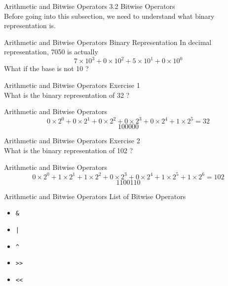 \documentclass{beamer}
\begin{document}
    \begin{frame}{Arithmetic and Bitwise Operators}
        \color{blue} \Large 3.2 Bitwise Operators \\
        
        \color{black} \normalsize \vskip 10pt 
        Before going into this subsection, we need to understand what binary 
        representation is.
    
    \end{frame}
    
    \begin{frame}{Arithmetic and Bitwise Operators}
        \color{blue} \Large Binary Representation
        \color{black} \normalsize \vskip 10pt
        In decimal representation, 7050 is actually
        \[ 7 \times 10^3 + 0 \times 10^2 + 5 \times 10^1 + 0 \times 10^0 \]
        \vskip 30pt
        What if the base is not 10 ?
    \end{frame}
    
    \begin{frame}{Arithmetic and Bitwise Operators}
        \color{blue} \Large Exercise 1 \\
        \color{black} \normalsize \vskip 10pt
        What is the binary representation of 32 ?
    \end{frame}

    \begin{frame}{Arithmetic and Bitwise Operators}
        $$ 0 \times 2^0 + 0 \times 2^1 + 0 \times 2^2 + 0 \times 2^3
        + 0 \times 2^4 + 1 \times 2^5 = 32 $$
        $$ 100000 $$
    \end{frame}
    
    \begin{frame}{Arithmetic and Bitwise Operators}
        \color{blue} \Large Exercise 2 \\
        \color{black} \normalsize \vskip 10pt
        What is the binary representation of 102 ?
    \end{frame}

    \begin{frame}{Arithmetic and Bitwise Operators}
        $$ 0 \times 2^0 + 1 \times 2^1 + 1 \times 2^2 + 0 \times 2^3
        + 0 \times 2^4 + 1 \times 2^5 + 1 \times 2^6 = 102 $$
        $$ 1100110 $$
    \end{frame}
    
    \begin{frame}{Arithmetic and Bitwise Operators}
        \color{blue} \Large List of Bitwise Operators \\
        \color{black} \normalsize \vskip 10pt
        
        \begin{itemize}
            \item \texttt{\&}
            \item \texttt{|}
            \item \texttt{\^}
            \item \texttt{>>}
            \item \texttt{<<}
        \end{itemize}
    \end{frame}
\end{document}
